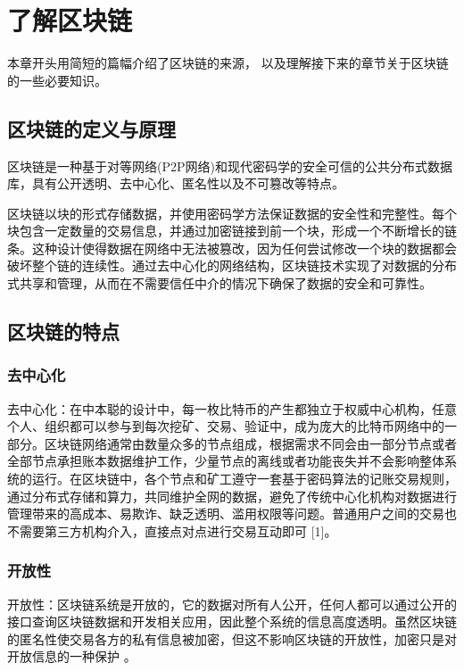 
\chapter{了解区块链}

本章开头用简短的篇幅介绍了区块链的来源，
以及理解接下来的章节关于区块链的一些必要知识。

\section{区块链的定义与原理}

区块链是一种基于对等网络(P2P网络)和现代密码学的安全可信的公共分布式数据库，具有公开透明、去中心化、匿名性以及不可篡改等特点。

区块链以块的形式存储数据，并使用密码学方法保证数据的安全性和完整性。每个块包含一定数量的交易信息，并通过加密链接到前一个块，形成一个不断增长的链条。这种设计使得数据在网络中无法被篡改，因为任何尝试修改一个块的数据都会破坏整个链的连续性。通过去中心化的网络结构，区块链技术实现了对数据的分布式共享和管理，从而在不需要信任中介的情况下确保了数据的安全和可靠性。



\section{区块链的特点}

\subsection{去中心化}
	
去中心化：在中本聪的设计中，每一枚比特币的产生都独立于权威中心机构，任意个人、组织都可以参与到每次挖矿、交易、验证中，成为庞大的比特币网络中的一部分。区块链网络通常由数量众多的节点组成，根据需求不同会由一部分节点或者全部节点承担账本数据维护工作，少量节点的离线或者功能丧失并不会影响整体系统的运行。在区块链中，各个节点和矿工遵守一套基于密码算法的记账交易规则，通过分布式存储和算力，共同维护全网的数据，避免了传统中心化机构对数据进行管理带来的高成本、易欺诈、缺乏透明、滥用权限等问题。普通用户之间的交易也不需要第三方机构介入，直接点对点进行交易互动即可 [1]。

\subsection{开放性}
开放性：区块链系统是开放的，它的数据对所有人公开，任何人都可以通过公开的接口查询区块链数据和开发相关应用，因此整个系统的信息高度透明。虽然区块链的匿名性使交易各方的私有信息被加密，但这不影响区块链的开放性，加密只是对开放信息的一种保护 。

